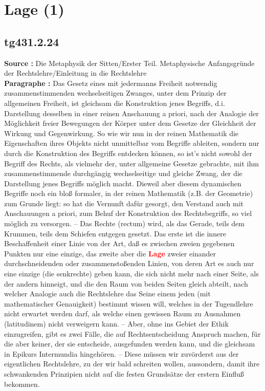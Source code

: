 \documentclass[a4paper,12pt,twoside]{book}
\newcommand{\match}[1]{\textcolor{red}{\textbf{#1}}}
\newcommand{\unnumberedsection}[1]{
	\section*{#1}
	\addcontentsline{toc}{section}{#1}
	\markright{#1}
}
\begin{document}
	\unnumberedsection{Lage (1)} 
	\subsection*{tg431.2.24} 
	\textbf{Source : }Die Metaphysik der Sitten/Erster Teil. Metaphysische Anfangsgründe der Rechtslehre/Einleitung in die Rechtslehre\\  
	
	\textbf{Paragraphe : }Das Gesetz eines mit jedermanns Freiheit notwendig zusammenstimmenden wechselseitigen Zwanges, unter dem Prinzip der allgemeinen Freiheit, ist gleichsam die Konstruktion jenes Begriffs, d.i. Darstellung desselben in einer reinen Anschauung a priori, nach der Analogie der Möglichkeit freier Bewegungen der Körper unter dem Gesetze der Gleichheit der Wirkung und Gegenwirkung. So wie wir nun in der reinen Mathematik die Eigenschaften ihres Objekts nicht unmittelbar vom Begriffe ableiten, sondern nur durch die Konstruktion des Begriffs entdecken können, so ist's nicht sowohl der Begriff des Rechts, als vielmehr der, unter allgemeine Gesetze gebrachte, mit ihm zusammenstimmende durchgängig wechselseitige und gleiche Zwang, der die Darstellung jenes Begriffs möglich macht. Dieweil aber diesem dynamischen Begriffe noch ein bloß formaler, in der reinen Mathematik (z.B. der Geometrie) zum Grunde liegt: so hat die Vernunft dafür gesorgt, den Verstand auch mit Anschauungen a priori, zum Behuf der Konstruktion des Rechtsbegriffs, so viel möglich zu versorgen. – Das Rechte (rectum) wird, als das Gerade, teils dem Krummen, teils dem Schiefen entgegen gesetzt. Das erste ist die innere Beschaffenheit einer Linie von der Art, daß es zwischen zweien gegebenen Punkten nur eine einzige, das zweite aber die \match{Lage} zweier einander durchschneidenden oder zusammenstoßenden Linien, von deren Art es auch nur eine einzige (die senkrechte) geben kann, die sich nicht mehr nach einer Seite, als der andern hinneigt, und die den Raum von beiden Seiten gleich abteilt, nach welcher Analogie auch die Rechtslehre das Seine einem jeden (mit mathematischer Genauigkeit) bestimmt wissen will, welches in der Tugendlehre nicht erwartet werden darf, als welche einen gewissen Raum zu Ausnahmen (latitudinem) nicht verweigern kann. – Aber, ohne ins Gebiet der Ethik einzugreifen, gibt es zwei Fälle, die auf Rechtsentscheidung  Anspruch machen, für die aber keiner, der sie entscheide, ausgefunden werden kann, und die gleichsam in Epikurs Intermundia hingehören. – Diese müssen wir zuvörderst aus der eigentlichen Rechtslehre, zu der wir bald schreiten wollen, aussondern, damit ihre schwankenden Prinzipien nicht auf die festen Grundsätze der erstern Einfluß bekommen. 
	
\end{document}
